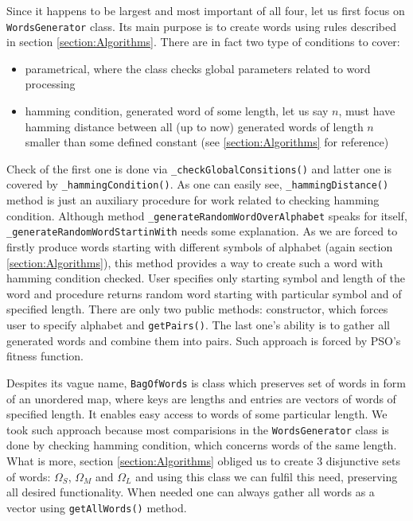 \documentclass{article}
\begin{document}
Since it happens to be largest and most important of all four, let us first focus on \texttt{WordsGenerator} class. Its main purpose is to create words using rules described in section \ref{section:Algorithms}. There are in fact two type of conditions to cover:
\begin{itemize}
\item parametrical, where the class checks global parameters related to word processing
\item hamming condition, generated word of some length, let us say $n$, must have hamming distance between all (up to now) generated words of length $n$ smaller than some defined constant (see \ref{section:Algorithms} for reference)
\end{itemize}

Check of the first one is done via \texttt{\_checkGlobalConsitions()} and latter one is covered by \texttt{\_hammingCondition()}. As one can easily see, \texttt{\_hammingDistance()} method is just an auxiliary procedure for work related to checking hamming condition. Although method \texttt{\_generateRandomWordOverAlphabet} speaks for itself, \texttt{\_generateRandomWordStartinWith} needs some explanation. As we are forced to firstly produce words starting with different symbols of alphabet (again section \ref{section:Algorithms}), this method provides a way to create such a word with hamming condition checked. User specifies only starting symbol and length of the word and procedure returns random word starting with particular symbol and of specified length. There are only two public methods: constructor, which forces user to specify alphabet and \texttt{getPairs()}. The last one's ability is to gather all generated words and combine them into pairs. Such approach is forced by PSO's fitness function. 

Despites its vague name, \texttt{BagOfWords} is class which preserves set of words in form of an unordered map, where keys are lengths and entries are vectors of words of specified length. It enables easy access to words of some particular length. We took such approach because most comparisions in the \texttt{WordsGenerator} class is done by checking hamming condition, which concerns words of the same length. What is more, section \ref{section:Algorithms} obliged us to create 3 disjunctive sets of words: $\Omega_S$, $\Omega_M$ and $\Omega_L$ and using this class we can fulfil this need, preserving all desired functionality. When needed one can always gather all words as a vector using \texttt{getAllWords()} method.
\end{document}
